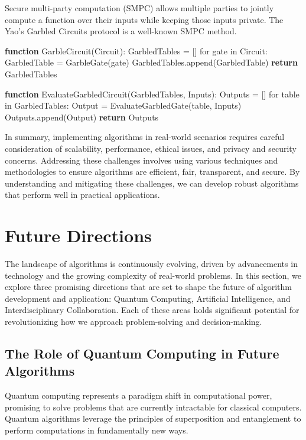 \documentclass[12pt]{book} %
\begin{document}
Secure multi-party computation (SMPC) allows multiple parties to jointly compute a function over their inputs while keeping those inputs private. The Yao's Garbled Circuits protocol is a well-known SMPC method.
\FloatBarrier
\begin{algorithm}[H]
\caption{Yao's Garbled Circuits Protocol (Simplified)}
\begin{algorithmic}
\State \textbf{function} GarbleCircuit(Circuit):
\State \quad GarbledTables = []
\State \quad for gate in Circuit:
\State \quad \quad GarbledTable = GarbleGate(gate)
\State \quad \quad GarbledTables.append(GarbledTable)
\State \quad \textbf{return} GarbledTables

\State \textbf{function} EvaluateGarbledCircuit(GarbledTables, Inputs):
\State \quad Outputs = []
\State \quad for table in GarbledTables:
\State \quad \quad Output = EvaluateGarbledGate(table, Inputs)
\State \quad \quad Outputs.append(Output)
\State \quad \textbf{return} Outputs
\end{algorithmic}
\end{algorithm}

\FloatBarrier

In summary, implementing algorithms in real-world scenarios requires careful consideration of scalability, performance, ethical issues, and privacy and security concerns. Addressing these challenges involves using various techniques and methodologies to ensure algorithms are efficient, fair, transparent, and secure. By understanding and mitigating these challenges, we can develop robust algorithms that perform well in practical applications.


\section{Future Directions}
The landscape of algorithms is continuously evolving, driven by advancements in technology and the growing complexity of real-world problems. In this section, we explore three promising directions that are set to shape the future of algorithm development and application: Quantum Computing, Artificial Intelligence, and Interdisciplinary Collaboration. Each of these areas holds significant potential for revolutionizing how we approach problem-solving and decision-making.

\subsection{The Role of Quantum Computing in Future Algorithms}
Quantum computing represents a paradigm shift in computational power, promising to solve problems that are currently intractable for classical computers. Quantum algorithms leverage the principles of superposition and entanglement to perform computations in fundamentally new ways.
\end{document}
